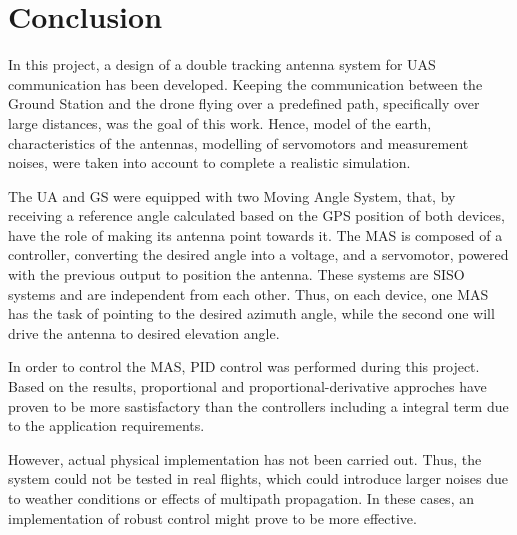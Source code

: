 \chapter{Conclusion}\label{ch:conclusion}


In this project, a design of a double tracking antenna system for UAS communication has been developed. Keeping the communication between the Ground Station and the drone flying over a predefined path, specifically over large distances, was the goal of this work. Hence, model of the earth, characteristics of the antennas, modelling of servomotors and measurement noises, were taken into account to complete a realistic simulation.

The UA and GS were equipped with two Moving Angle System, that, by receiving a reference angle calculated based on the GPS position of both devices, have the role of making its antenna point towards it. The MAS is composed of a controller, converting the desired angle into a voltage, and a servomotor, powered with the previous output to position the antenna. These systems are SISO systems and are independent from each other. Thus, on each device, one MAS has the task of pointing to the desired azimuth angle, while the second one will drive the antenna to desired elevation angle.

In order to control the MAS, PID control was performed during this project. Based on the results, proportional and proportional-derivative approches have proven to be more sastisfactory than the controllers including a integral term due to the application requirements.



However, actual physical implementation has not been carried out. Thus, the system could not be tested in real flights, which could introduce larger noises due to weather conditions or effects of multipath propagation. In these cases, an implementation of robust control might prove to be more effective.



